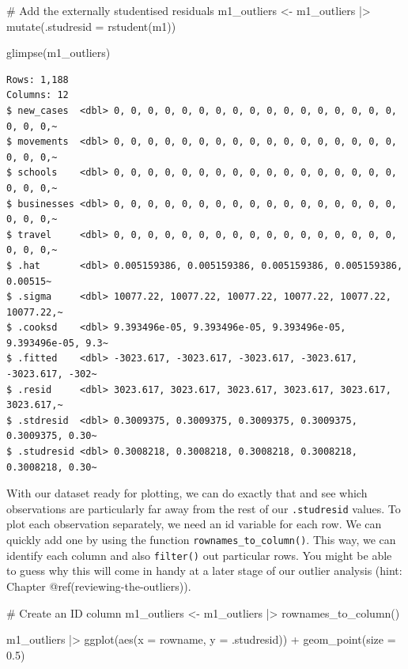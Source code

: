 \documentclass[
  letterpaper,
]{krantz}
\makeatletter
\newenvironment{Shaded}{\begin{snugshade}}{\end{snugshade}}
\newcommand{\AttributeTok}[1]{\textcolor[rgb]{0.40,0.45,0.13}{#1}}
\newcommand{\CommentTok}[1]{\textcolor[rgb]{0.37,0.37,0.37}{#1}}
\newcommand{\FloatTok}[1]{\textcolor[rgb]{0.68,0.00,0.00}{#1}}
\newcommand{\FunctionTok}[1]{\textcolor[rgb]{0.28,0.35,0.67}{#1}}
\newcommand{\NormalTok}[1]{\textcolor[rgb]{0.00,0.23,0.31}{#1}}
\newcommand{\OtherTok}[1]{\textcolor[rgb]{0.00,0.23,0.31}{#1}}
\newcommand{\SpecialCharTok}[1]{\textcolor[rgb]{0.37,0.37,0.37}{#1}}
\newenvironment{kframe}{%
\medskip{}
\setlength{\fboxsep}{.8em}
 \def\at@end@of@kframe{}%
 \ifinner\ifhmode%
  \def\at@end@of@kframe{\end{minipage}}%
  \begin{minipage}{\columnwidth}%
 \fi\fi%
 \def\FrameCommand##1{\hskip\@totalleftmargin \hskip-\fboxsep
 \colorbox{shadecolor}{##1}\hskip-\fboxsep
     \hskip-\linewidth \hskip-\@totalleftmargin \hskip\columnwidth}%
 \MakeFramed {\advance\hsize-\width
   \@totalleftmargin\z@ \linewidth\hsize
   \@setminipage}}%
 {\par\unskip\endMakeFramed%
 \at@end@of@kframe}
\renewenvironment{Shaded}{\begin{kframe}}{\end{kframe}}
\makeatother
\begin{document}
\begin{Shaded}
\begin{Highlighting}[]
\CommentTok{\# Add the externally studentised residuals}
\NormalTok{m1\_outliers }\OtherTok{\textless{}{-}}
\NormalTok{  m1\_outliers }\SpecialCharTok{|\textgreater{}}
  \FunctionTok{mutate}\NormalTok{(}\AttributeTok{.studresid =} \FunctionTok{rstudent}\NormalTok{(m1))}

\FunctionTok{glimpse}\NormalTok{(m1\_outliers)}
\end{Highlighting}
\end{Shaded}

\begin{verbatim}
Rows: 1,188
Columns: 12
$ new_cases  <dbl> 0, 0, 0, 0, 0, 0, 0, 0, 0, 0, 0, 0, 0, 0, 0, 0, 0, 0, 0, 0,~
$ movements  <dbl> 0, 0, 0, 0, 0, 0, 0, 0, 0, 0, 0, 0, 0, 0, 0, 0, 0, 0, 0, 0,~
$ schools    <dbl> 0, 0, 0, 0, 0, 0, 0, 0, 0, 0, 0, 0, 0, 0, 0, 0, 0, 0, 0, 0,~
$ businesses <dbl> 0, 0, 0, 0, 0, 0, 0, 0, 0, 0, 0, 0, 0, 0, 0, 0, 0, 0, 0, 0,~
$ travel     <dbl> 0, 0, 0, 0, 0, 0, 0, 0, 0, 0, 0, 0, 0, 0, 0, 0, 0, 0, 0, 0,~
$ .hat       <dbl> 0.005159386, 0.005159386, 0.005159386, 0.005159386, 0.00515~
$ .sigma     <dbl> 10077.22, 10077.22, 10077.22, 10077.22, 10077.22, 10077.22,~
$ .cooksd    <dbl> 9.393496e-05, 9.393496e-05, 9.393496e-05, 9.393496e-05, 9.3~
$ .fitted    <dbl> -3023.617, -3023.617, -3023.617, -3023.617, -3023.617, -302~
$ .resid     <dbl> 3023.617, 3023.617, 3023.617, 3023.617, 3023.617, 3023.617,~
$ .stdresid  <dbl> 0.3009375, 0.3009375, 0.3009375, 0.3009375, 0.3009375, 0.30~
$ .studresid <dbl> 0.3008218, 0.3008218, 0.3008218, 0.3008218, 0.3008218, 0.30~
\end{verbatim}

With our dataset ready for plotting, we can do exactly that and see
which observations are particularly far away from the rest of our
\texttt{.studresid} values. To plot each observation separately, we need
an id variable for each row. We can quickly add one by using the
function \texttt{rownames\_to\_column()}. This way, we can identify each
column and also \texttt{filter()} out particular rows. You might be able
to guess why this will come in handy at a later stage of our outlier
analysis (hint: Chapter @ref(reviewing-the-outliers)).

\begin{Shaded}
\begin{Highlighting}[]
\CommentTok{\# Create an ID column}
\NormalTok{m1\_outliers }\OtherTok{\textless{}{-}}\NormalTok{ m1\_outliers }\SpecialCharTok{|\textgreater{}} \FunctionTok{rownames\_to\_column}\NormalTok{()}

\NormalTok{m1\_outliers }\SpecialCharTok{|\textgreater{}}
  \FunctionTok{ggplot}\NormalTok{(}\FunctionTok{aes}\NormalTok{(}\AttributeTok{x =}\NormalTok{ rowname,}
             \AttributeTok{y =}\NormalTok{ .studresid)) }\SpecialCharTok{+}
  \FunctionTok{geom\_point}\NormalTok{(}\AttributeTok{size =} \FloatTok{0.5}\NormalTok{)}
\end{Highlighting}
\end{Shaded}
\end{document}
